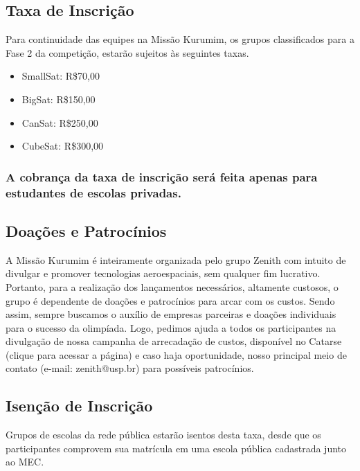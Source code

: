     \subsection{Taxa de Inscrição}\label{sec: taxa}

        \par Para continuidade das equipes na Missão Kurumim, os grupos classificados 
        para a Fase 2 da competição, estarão sujeitos às seguintes taxas.

        \begin{itemize}
            \item SmallSat: R\$70,00
            \item BigSat: R\$150,00
            \item CanSat: R\$250,00
            \item CubeSat: R\$300,00
        \end{itemize}

        \subsubsection{A cobrança da taxa de inscrição será feita apenas para estudantes 
        de escolas privadas.}\label{sec:taxa_privada}

    \subsection{Doações e Patrocínios}\label{sec:doacoes}
        \par A Missão Kurumim é inteiramente organizada pelo grupo Zenith com intuito de 
        divulgar e promover tecnologias aeroespaciais, sem qualquer fim lucrativo. Portanto,
        para a realização dos lançamentos necessários, altamente custosos, o grupo é dependente
        de doações e patrocínios para arcar com os custos. Sendo assim, sempre buscamos o auxílio 
        de empresas parceiras e doações individuais para o sucesso da olimpíada. Logo, pedimos ajuda 
        a todos os participantes na divulgação de nossa campanha de arrecadação de custos, disponível 
        no Catarse (clique para acessar a página) e caso haja oportunidade, nosso principal meio de 
        contato (e-mail: zenith@usp.br) para possíveis patrocínios.

    \subsection{Isenção de Inscrição}\label{sec:isencao}
        \par Grupos de escolas da rede pública estarão isentos desta taxa, desde que os participantes 
        comprovem sua matrícula em uma escola pública cadastrada junto ao MEC.

